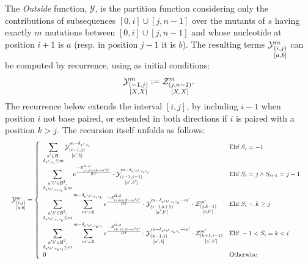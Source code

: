 The \emph{Outside} function, $\mathcal Y$, is the partition function considering only the 
contributions of subsequences $[0,i]\cup[j,n-1]$ over the mutants of $s$ having exactly $m$ mutations between $[0,i]\cup[j,n-1]$ and whose nucleotide at position $i+1$ is $a$ 
(resp. in position $j-1$ it is $b$).
The resulting terms $\Y{i,j}{m}{a,b}$ can be computed by recurrence, using as initial conditions:
\begin{equation}
	\Y{-1,j}{m}{X,X}:=
		\displaystyle
	  \Z{j,n-1}{m}{X,X}.
\label{eq:Y_in}
\end{equation}
The recurrence below extends the interval $[i,j]$, by including $i-1$ when
position $i$ not base paired, or extended in both directions if $i$ is paired with a position $k>j$.
The recursion itself unfolds as follows:
\begin{equation}
\resizebox{\textwidth}{!}{%
	$\Y{i,j}{m}{a,b} = \left\{
  \begin{array}{ll}
		\displaystyle
    \sum_{\substack{a'\in \B,\\ \Kron_{a',s_i}\le m}}
    \Y{i-1,j}{m- \Kron_{a',s_i}}{a',b} &
    \text{Elif }S_i=-1 \\
    \displaystyle
    \sum_{\substack{a'b'\in \B^2,\\ \Kron_{a'b',s_is_j}\le m}}
		 e^{\frac{-E_{(i,j),ab \to a'b'}^{\Omega,\beta}}{RT}}\cdot
    \Y{i-1,j+1}{m- \Kron_{a'b',s_is_j}}{a',b'} &
   	 \text{Elif }S_{i}=j \land S_{i+1}=j-1\\
		 \displaystyle
		 \sum_{\substack{a'b'\in \B^2,\\ \Kron_{a'b',s_is_k}\le m}}
		 \sum_{m'=0}^{m-\Kron_{a'b',s_is_k}}
  		 e^{\frac{-E_{(i,k),\varnothing\to a'b'}^{\Omega,\beta}}{RT}}
		 \cdot\Y{i-1,k+1}{m- \Kron_{a'b',s_is_k} - m'}{a',b'}
     \cdot\Z{j,k-1}{m'}{b,b'} &
		 \text{Elif }S_{i}=k \geq j\\
		 \displaystyle
		 \sum_{\substack{a'b'\in \B^2,\\ \Kron_{a'b',s_ks_i}\le m}}
		 \sum_{m'=0}^{m-\Kron_{a'b',s_ks_i}}
   	 e^{\frac{-E_{(k,i),\varnothing\to a'b'}^{\Omega,\beta}}{RT}}
		 \cdot\Y{k-1,j}{m- \Kron_{a'b',s_ks_i} - m'}{a',b}
     \cdot\Z{k+1,i-1}{m'}{a',b'} &
		 \text{Elif }-1 < S_{i}=k < i\\
		 0 & \text{Otherwise}
  \end{array}\right.$
}\label{eq:Y_rec}
\end{equation}
